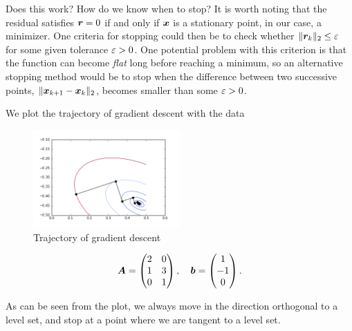 Does this work? How do we know when to stop? It is worth noting that the residual satisfies $\bm{r}=0$ if and only if $\bm{x}$ is a stationary point, in our case, a minimizer. One criteria for stopping could then be to check whether $\Vert {\bm{r}_k}\Vert_2\leq \varepsilon$ for some given tolerance $\varepsilon>0$. One potential problem with this criterion is that the function can become {\em flat} long before reaching a minimum, so an alternative stopping method would be to stop when the difference between two successive points, $\Vert {\bm{x}_{k+1}-\bm{x}_k}\Vert_2$, becomes smaller than some $\varepsilon>0$.

\begin{example}
We plot the trajectory of gradient descent with the data

\begin{figure}[h!]
\centering
\includegraphics[width=0.5\textwidth]{images/graddescent.png}
\caption{Trajectory of gradient descent}
\end{figure}

\begin{equation*}
\bm{A} = \begin{pmatrix}
2 & 0\\
1 & 3\\
0 & 1
\end{pmatrix}, \quad
\bm{b} = \begin{pmatrix}
1\\ -1\\ 0
\end{pmatrix}.
\end{equation*}


As can be seen from the plot, we always move in the direction orthogonal to a level set, and stop at a point where we are tangent to a level set.
\end{example}



